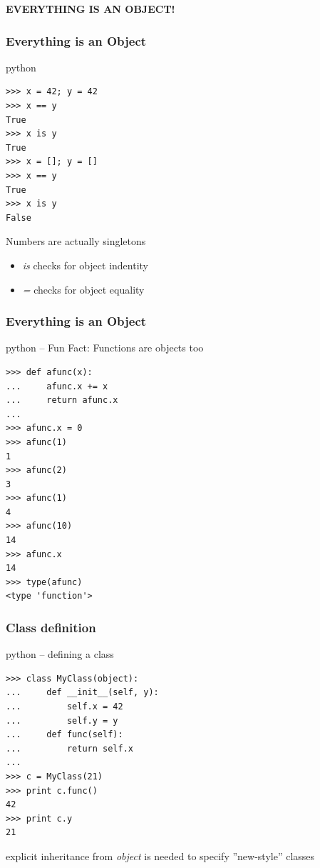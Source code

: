 \documentclass{beamer}
\begin{document}
\begin{frame}[plain]
	\begin{center}
	\huge{\textbf{EVERYTHING IS AN OBJECT!}}
	\end{center}
\end{frame}

\begin{frame}[fragile]
	\frametitle{Everything is an Object}
	\begin{exampleblock}{python}
	\begin{lstlisting}
>>> x = 42; y = 42
>>> x == y
True
>>> x is y
True
>>> x = []; y = []
>>> x == y
True
>>> x is y
False
	\end{lstlisting}
	\end{exampleblock}
	Numbers are actually singletons\\
	\begin{itemize}
		\item \emph{is} checks for object indentity
		\item \emph{=} checks for object equality
	\end{itemize}
\end{frame}

\begin{frame}[fragile]
	\frametitle{Everything is an Object}
	\begin{exampleblock}{python -- 	Fun Fact: Functions are objects too}
	\begin{lstlisting}
>>> def afunc(x):
...     afunc.x += x
...     return afunc.x
...     
>>> afunc.x = 0
>>> afunc(1)
1
>>> afunc(2)
3
>>> afunc(1)
4
>>> afunc(10)
14
>>> afunc.x
14
>>> type(afunc)
<type 'function'>
	\end{lstlisting}
	\end{exampleblock}
\end{frame}

\begin{frame}[fragile]
	\frametitle{Class definition}
	\begin{exampleblock}{python -- defining a class}
	\begin{lstlisting}
>>> class MyClass(object):
...     def __init__(self, y):
...         self.x = 42
...         self.y = y
...     def func(self):
...         return self.x
... 
>>> c = MyClass(21)
>>> print c.func()
42
>>> print c.y
21
	\end{lstlisting}
	\end{exampleblock}
	
	explicit inheritance from \emph{object} is needed to specify ''new-style'' classes
\end{frame}
\end{document}

